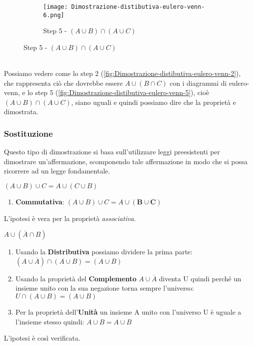 \begin{example}
\begin{figure}[h!]
\begin{subfigure}{.3\textwidth}
            \texttt{[image: Dimostrazione-distibutiva-eulero-venn-6.png]}
            \caption{Step 5 - $(A \cup B) \cap (A \cup C)$}
            \label{fig:Dimostrazione-distibutiva-eulero-venn-6}
        \end{subfigure}
    \end{figure}
    \\ Possiamo vedere come lo step 2 (\ref{fig:Dimostrazione-distibutiva-eulero-venn-2}), che rappresenta ciò che dovrebbe essere $A \cup (B \cap C)$ con i diagrammi di eulero-venn, e lo step 5 (\ref{fig:Dimostrazione-distibutiva-eulero-venn-5}), cioè $(A \cup B) \cap (A \cup C)$, siano uguali e quindi possiamo dire che la proprietà e dimostrata.  
\end{example}


\subsubsection{Sostituzione}
Questo tipo di dimostrazione si basa sull'utilizzare leggi preesistenti per dimostrare un'affermazione, scomponendo tale affermazione in modo che si possa ricorrere ad un legge fondamentale.
\begin{example}
    $(A \cup B) \cup C = A \cup (C \cup B)$
    \begin{enumerate}
        \item \textbf{Commutativa}: $(A \cup B) \cup C = A \cup (\mathbf{B \cup C})$
    \end{enumerate}
    L'ipotesi è vera per la proprietà \emph{associativa}.
\end{example}
\begin{example}
    $A \cup (\overline{A} \cap B)$
    \begin{enumerate}
        \item Usando la \textbf{Distributiva} possiamo dividere la prima parte: $(A \cup \overline{A}) \cap (A \cup B) = (A \cup B)$
        \item Usando la proprietà del \textbf{Complemento} $A \cup \overline{A}$ diventa U quindi perché un insieme unito con la sua negazione torna sempre l'universo: $U \cap (A \cup B) = (A \cup B) $
        \item Per la proprietà dell'\textbf{Unità} un insieme A unito con l'universo U è uguale a l'insieme stesso quindi: $A \cup B = A \cup B$
    \end{enumerate}
    L'ipotesi è così verificata.
\end{example}
 
